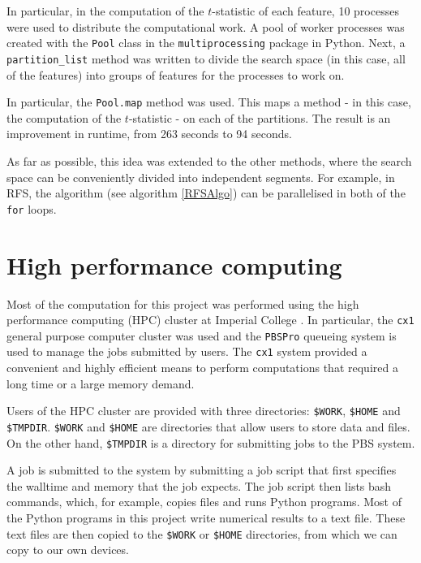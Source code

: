 \documentclass[12pt, twoside, a4paper]{report}
\begin{document}
In particular, in the computation of the $t$-statistic of each feature, 10 processes were used to distribute the computational work. A pool of worker processes was created with the \texttt{Pool} class in the \texttt{multiprocessing} package in Python. Next, a \texttt{partition\_list} method was written to divide the search space (in this case, all of the features) into groups of features for the processes to work on.

In particular, the \texttt{Pool.map} method was used. This maps a method - in this case, the computation of the $t$-statistic - on each of the partitions. The result is an improvement in runtime, from 263 seconds to 94 seconds.

As far as possible, this idea was extended to the other methods, where the search space can be conveniently divided into independent segments. For example, in RFS, the algorithm (see algorithm \ref{RFSAlgo}) can be parallelised in both of the \texttt{for} loops.

\section{High performance computing} \label{hpc}

Most of the computation for this project was performed using the high performance computing (HPC) cluster at Imperial College \cite{RefWorks:218}. In particular, the \texttt{cx1} general purpose computer cluster was used and the \texttt{PBSPro} queueing system is used to manage the jobs submitted by users. The \texttt{cx1} system provided a convenient and highly efficient means to perform computations that required a long time or a large memory demand.

Users of the HPC cluster are provided with three directories: \texttt{\$WORK}, \texttt{\$HOME} and \texttt{\$TMPDIR}. \texttt{\$WORK} and \texttt{\$HOME} are directories that allow users to store data and files. On the other hand, \texttt{\$TMPDIR} is a directory for submitting jobs to the PBS system.

A job is submitted to the system by submitting a job script that first specifies the walltime and memory that the job expects. The job script then lists bash commands, which, for example, copies files and runs Python programs. Most of the Python programs in this project write numerical results to a text file. These text files are then copied to the \texttt{\$WORK} or \texttt{\$HOME} directories, from which we can copy to our own devices.
\end{document}
